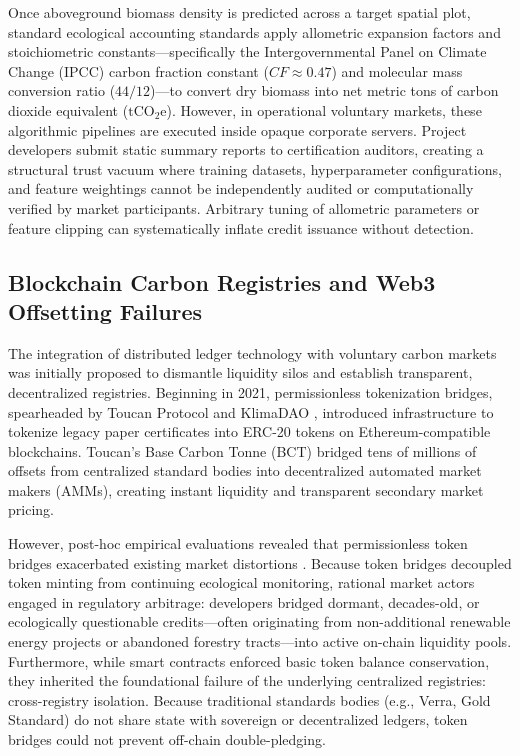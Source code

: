 \documentclass[preprint,12pt]{elsarticle}
\begin{document}
Once aboveground biomass density is predicted across a target spatial plot, standard ecological accounting standards apply allometric expansion factors and stoichiometric constants—specifically the Intergovernmental Panel on Climate Change (IPCC) carbon fraction constant ($CF \approx 0.47$) and molecular mass conversion ratio ($44/12$)—to convert dry biomass into net metric tons of carbon dioxide equivalent ($\text{tCO}_2\text{e}$). However, in operational voluntary markets, these algorithmic pipelines are executed inside opaque corporate servers. Project developers submit static summary reports to certification auditors, creating a structural trust vacuum where training datasets, hyperparameter configurations, and feature weightings cannot be independently audited or computationally verified by market participants. Arbitrary tuning of allometric parameters or feature clipping can systematically inflate credit issuance without detection.

\subsection{Blockchain Carbon Registries and Web3 Offsetting Failures}

The integration of distributed ledger technology with voluntary carbon markets was initially proposed to dismantle liquidity silos and establish transparent, decentralized registries. Beginning in 2021, permissionless tokenization bridges, spearheaded by Toucan Protocol \cite{toucan2022protocol} and KlimaDAO \cite{klimadao2022algorithmic}, introduced infrastructure to tokenize legacy paper certificates into ERC-20 tokens on Ethereum-compatible blockchains. Toucan's Base Carbon Tonne (BCT) bridged tens of millions of offsets from centralized standard bodies into decentralized automated market makers (AMMs), creating instant liquidity and transparent secondary market pricing. 

However, post-hoc empirical evaluations revealed that permissionless token bridges exacerbated existing market distortions \cite{franke2022operationalizing,mohan2023blockchain}. Because token bridges decoupled token minting from continuing ecological monitoring, rational market actors engaged in regulatory arbitrage: developers bridged dormant, decades-old, or ecologically questionable credits—often originating from non-additional renewable energy projects or abandoned forestry tracts—into active on-chain liquidity pools. Furthermore, while smart contracts enforced basic token balance conservation, they inherited the foundational failure of the underlying centralized registries: cross-registry isolation. Because traditional standards bodies (e.g., Verra, Gold Standard) do not share state with sovereign or decentralized ledgers, token bridges could not prevent off-chain double-pledging. 
\end{document}
